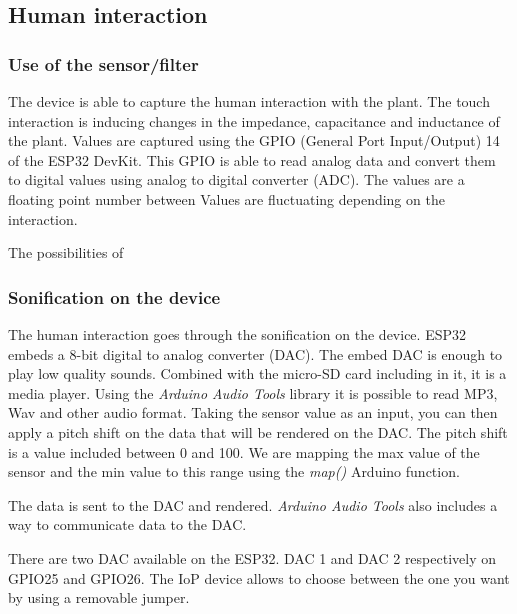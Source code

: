 \subsection{Human interaction}

\subsubsection{Use of the sensor/filter}

The device is able to capture the human interaction with the plant. The touch interaction is inducing changes
in the impedance, capacitance and inductance of the plant. Values are captured using the GPIO (General Port Input/Output)
14 of the ESP32 DevKit. This GPIO is able to read analog data and convert them to digital values using analog to digital
converter (ADC). The values are a floating point number between %
Values are fluctuating depending on the interaction.


The possibilities of


\subsubsection{Sonification on the device} %

The human interaction goes through the sonification on the device. ESP32 embeds a 8-bit digital to analog converter (DAC).
The embed DAC is enough to play low quality sounds. Combined with the micro-SD card including in it, it is a media player.
Using the \textit{Arduino Audio Tools} library it is possible to read MP3, Wav and other audio format.
Taking the sensor value as an input, you can then apply a pitch shift on the data that will be rendered on the DAC.
The pitch shift is a value included between 0 and 100. We are mapping the max value of the sensor and the min value
to this range using the \textit{map()} Arduino function.

The data is sent to the DAC and rendered. \textit{Arduino Audio Tools} also includes a way to communicate data to the
DAC.


There are two DAC available on the ESP32. DAC 1 and DAC 2 respectively on GPIO25 and GPIO26. The IoP device allows
to choose between the one you want by using a removable jumper.


